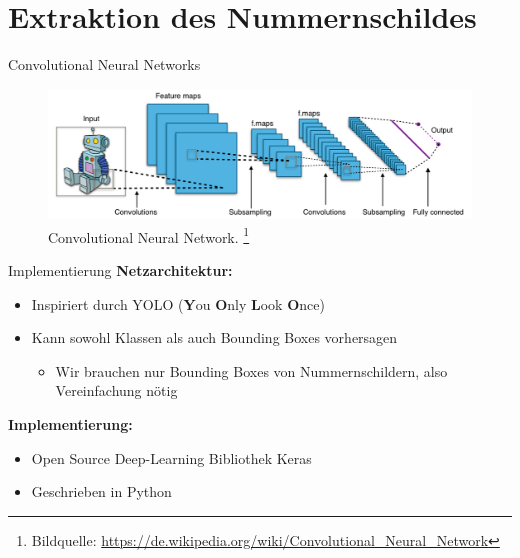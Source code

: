 \section{Extraktion des Nummernschildes}

\begin{frame}{Convolutional Neural Networks}
    \begin{figure}
        \includegraphics[width=\textwidth]{bilder/Typical_cnn.png}
        \caption{Convolutional Neural Network.
            \footnote{Bildquelle: \url{https://de.wikipedia.org/wiki/Convolutional_Neural_Network}}}
    \end{figure}
    \begin{center}
    \end{center}
\end{frame}

\begin{frame}{Implementierung}
    \textbf{Netzarchitektur:}
    \begin{itemize}
        \item Inspiriert durch YOLO (\textbf{Y}ou \textbf{O}nly \textbf{L}ook \textbf{O}nce) \cite{yolov3}
        \item Kann sowohl Klassen als auch Bounding Boxes vorhersagen
        \begin{itemize}
            \item[\rightarrow] Wir brauchen nur Bounding Boxes von Nummernschildern, also Vereinfachung n\"otig
        \end{itemize}
    \end{itemize}
    \textbf{Implementierung:}
    \begin{itemize}
        \item Open Source Deep-Learning Bibliothek Keras
        \item Geschrieben in Python
    \end{itemize}
\end{frame}